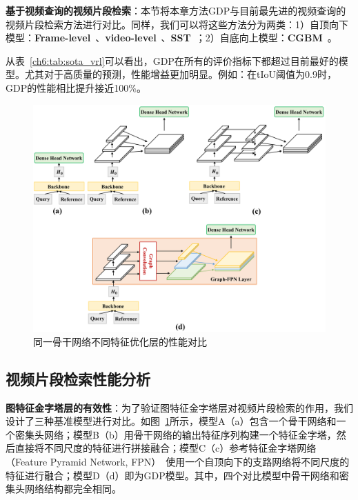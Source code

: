 \textbf{基于视频查询的视频片段检索}：本节将本章方法GDP与目前最先进的视频查询的视频片段检索方法进行对比。同样，我们可以将这些方法分为两类：1）自顶向下模型：\textbf{Frame-level}~\cite{feng2018video}、\textbf{video-level}~\cite{feng2018video}、\textbf{SST}~\cite{buch2017sst}；2）自底向上模型：\textbf{CGBM}~\cite{feng2018video}。

从表~\ref{ch6:tab:sota_vrl}可以看出，GDP在所有的评价指标下都超过目前最好的模型。尤其对于高质量的预测，性能增益更加明显。例如：在tIoU阈值为0.9时，GDP的性能相比提升接近100\%。


\begin{figure}[tbp]
    \centering
    \includegraphics[width=0.9\linewidth]{chapter6/res/ablative_backbone.pdf}
    \caption{同一骨干网络不同特征优化层的性能对比}
    \label{ch6:fig:ablative_backbone}
\end{figure}

\subsection{视频片段检索性能分析}

\textbf{图特征金字塔层的有效性}：为了验证图特征金字塔层对视频片段检索的作用，我们设计了三种基准模型进行对比。如图~\ref{ch6:fig:ablative_backbone}所示，模型A（a）包含一个骨干网络和一个密集头网络；模型B（b）用骨干网络的输出特征序列构建一个特征金字塔，然后直接将不同尺度的特征进行拼接融合；模型C（c）参考特征金字塔网络（Feature Pyramid Network, FPN）~\cite{lin2017feature}使用一个自顶向下的支路网络将不同尺度的特征进行融合；模型D（d）即为GDP模型。其中，四个对比模型中骨干网络和密集头网络结构都完全相同。

